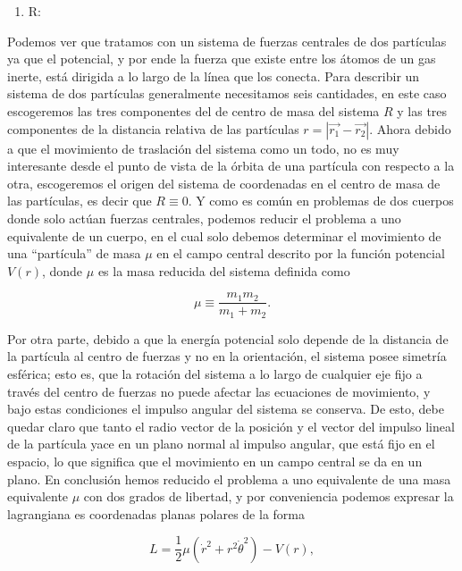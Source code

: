 \documentclass[a4paper,10pt]{article}
\numberwithin{equation}{section}
\begin{document}
\begin{enumerate}[label=\alph*)]
 \item R:
\end{enumerate}

Podemos ver que tratamos con un sistema de fuerzas centrales de dos partículas ya que 
el potencial, y por ende la fuerza que existe entre los átomos de un gas inerte, está 
dirigida a lo largo de la línea que los conecta. Para describir un sistema de dos 
partículas generalmente necesitamos seis cantidades, en este caso escogeremos las 
tres componentes del de centro de masa del sistema $R$ y las tres componentes de 
la distancia relativa de las partículas $r = |\overrightarrow{r_1} - \overrightarrow{r_2}|$. 
Ahora debido a que el movimiento de traslación del sistema como un todo, no es muy 
interesante desde el punto de vista de la órbita de una partícula con respecto a la 
otra, escogeremos el origen del sistema de coordenadas en el centro de masa de 
las partículas, es decir que $R \equiv 0$. Y como es común en problemas de 
dos cuerpos donde solo actúan fuerzas centrales, podemos reducir el problema 
a uno equivalente de un cuerpo, en el cual solo debemos determinar el movimiento 
de una ``partícula'' de masa $\mu$ en el campo central descrito por la función 
potencial $V(r)$, donde $\mu$ es la masa reducida del sistema definida como 

\begin{equation}
 \mu \equiv \frac{m_1m_2}{m_1+m_2}.
\end{equation}

Por otra parte, debido a que la energía potencial solo depende de la distancia de 
la partícula al centro de fuerzas y no en la orientación, el sistema posee simetría 
esférica; esto es, que la rotación del sistema a lo largo de cualquier eje fijo 
a través del centro de fuerzas no puede afectar las ecuaciones de movimiento, y bajo 
estas condiciones el impulso angular del sistema se conserva. De esto, debe quedar 
claro que tanto el radio vector de la posición y el vector del impulso lineal 
de la partícula yace en un plano normal al impulso angular, que está fijo en el 
espacio, lo que significa que el movimiento en un campo central se da en un 
plano. En conclusión hemos reducido el problema a uno equivalente de una masa 
equivalente $\mu$ con dos grados de libertad, y por conveniencia podemos expresar 
la lagrangiana es coordenadas planas polares de la forma 

\begin{equation}
 L = \frac{1}{2}\mu(\dot{r}^2 + r^2\dot{\theta}^2) - V(r),
\end{equation}
\end{document}
